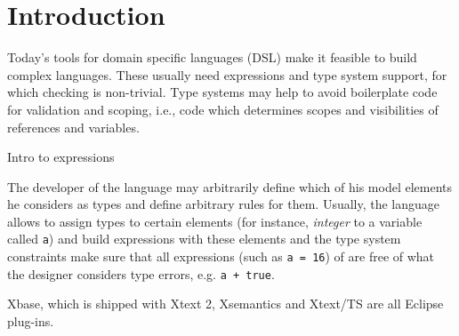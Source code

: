 \section{Introduction}

Today's tools for domain specific languages (DSL) make it feasible to build
complex languages. These usually need expressions and type system support, for
which checking is non-trivial. Type systems may help to avoid boilerplate code
for validation and scoping, i.e., code which determines scopes and visibilities
of references and variables.

Intro to expressions

The developer of the language may arbitrarily define which of his model elements
he considers as types and define arbitrary rules for them. Usually, the language
allows to assign types to certain elements (for instance, \emph{integer} to a
variable called \verb|a|) and build expressions with these elements and the type
system constraints make sure that all expressions (such as \verb|a = 16|) of are
free of what the designer considers type errors, e.g. \verb|a + true|.

Xbase, which is shipped with Xtext 2, Xsemantics \cite{lbts} and Xtext/TS
\cite{mvts} are all Eclipse plug-ins.
